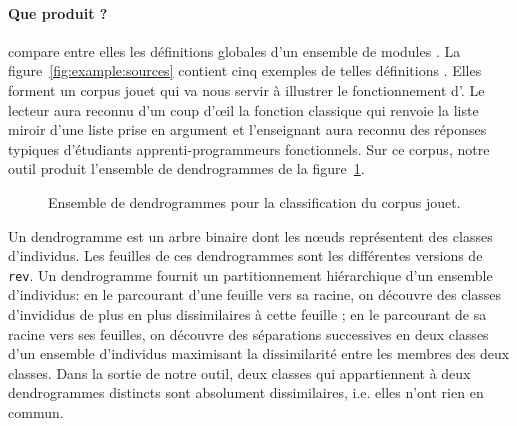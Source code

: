 \paragraph{Que produit {\Asak}?}
{\Asak} compare entre elles les définitions globales d'un ensemble de
modules {\OCaml}. La figure~\ref{fig:example:sources} contient cinq
exemples de telles définitions {\OCaml}. Elles forment un corpus jouet
qui va nous servir à illustrer le fonctionnement d'{\Asak}.  Le
lecteur aura reconnu d'un coup d'{\oe}il la fonction classique qui
renvoie la liste miroir d'une liste prise en argument et l'enseignant
aura reconnu des réponses typiques d'étudiants apprenti-programmeurs
fonctionnels. Sur ce corpus, notre outil produit l'ensemble de
dendrogrammes de la figure~\ref{fig:toy-classes}.

\begin{figure}
\begin{center}
\end{center}
\caption{Ensemble de dendrogrammes pour la classification du corpus jouet.}
\label{fig:toy-classes}
\end{figure}

Un dendrogramme est un arbre binaire dont les n{\oe}uds représentent
des classes d'individus. Les feuilles de ces dendrogrammes sont les
différentes versions de \texttt{rev}. Un dendrogramme fournit un
partitionnement hiérarchique d'un ensemble d'individus: en le
parcourant d'une feuille vers sa racine, on découvre des classes
d'invididus de plus en plus dissimilaires à cette feuille ; en le
parcourant de sa racine vers ses feuilles, on découvre des séparations
successives en deux classes d'un ensemble d'individus maximisant la
dissimilarité entre les membres des deux classes. Dans la sortie
de notre outil, deux classes qui appartiennent à deux dendrogrammes
distincts sont absolument dissimilaires, i.e. elles n'ont rien en
commun.

